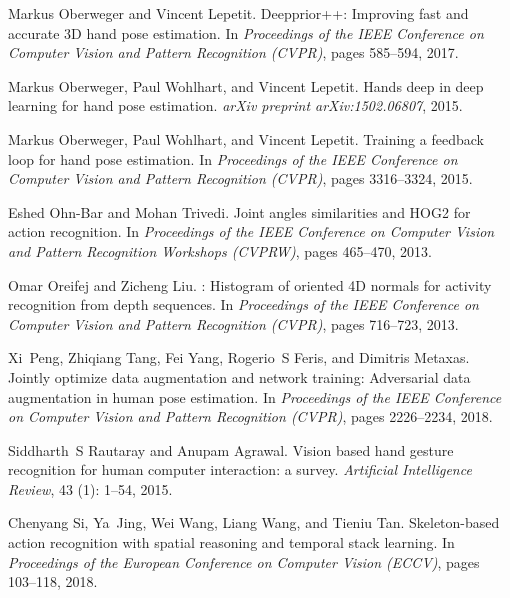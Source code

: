 \documentclass{bmvc2k}
\begin{document}
\begin{thebibliography}{42}
Markus Oberweger and Vincent Lepetit.
\newblock Deepprior++: Improving fast and accurate {3D} hand pose estimation.
\newblock In \emph{Proceedings of the IEEE Conference on Computer Vision and
  Pattern Recognition (CVPR)}, pages 585--594, 2017.

Markus Oberweger, Paul Wohlhart, and Vincent Lepetit.
\newblock Hands deep in deep learning for hand pose estimation.
\newblock \emph{arXiv preprint arXiv:1502.06807}, 2015{}.

Markus Oberweger, Paul Wohlhart, and Vincent Lepetit.
\newblock Training a feedback loop for hand pose estimation.
\newblock In \emph{Proceedings of the IEEE Conference on Computer Vision and
  Pattern Recognition (CVPR)}, pages 3316--3324, 2015{}.

Eshed Ohn-Bar and Mohan Trivedi.
\newblock Joint angles similarities and {HOG2} for action recognition.
\newblock In \emph{Proceedings of the IEEE Conference on Computer Vision and
  Pattern Recognition Workshops (CVPRW)}, pages 465--470, 2013.

Omar Oreifej and Zicheng Liu.
: Histogram of oriented {4D} normals for activity recognition
  from depth sequences.
\newblock In \emph{Proceedings of the IEEE Conference on Computer Vision and
  Pattern Recognition (CVPR)}, pages 716--723, 2013.

Xi~Peng, Zhiqiang Tang, Fei Yang, Rogerio~S Feris, and Dimitris Metaxas.
\newblock Jointly optimize data augmentation and network training: Adversarial
  data augmentation in human pose estimation.
\newblock In \emph{Proceedings of the IEEE Conference on Computer Vision and
  Pattern Recognition (CVPR)}, pages 2226--2234, 2018.

Siddharth~S Rautaray and Anupam Agrawal.
\newblock Vision based hand gesture recognition for human computer interaction:
  a survey.
\newblock \emph{Artificial Intelligence Review}, 43 (1):
  1--54, 2015.

Chenyang Si, Ya~Jing, Wei Wang, Liang Wang, and Tieniu Tan.
\newblock Skeleton-based action recognition with spatial reasoning and temporal
  stack learning.
\newblock In \emph{Proceedings of the European Conference on Computer Vision
  (ECCV)}, pages 103--118, 2018.


\end{thebibliography}
\end{document}
